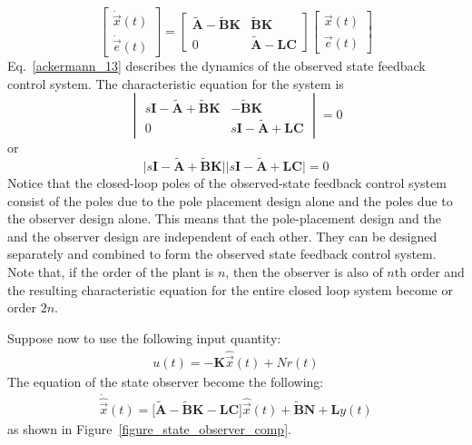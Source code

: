 \documentclass[12pt,a4paper,oneside]{book}
\begin{document}
\begin{onehalfspace}
\begin{equation} \label{ackermann_13}
	\begin{bmatrix} 
		\dot{\vec x}(t) \\[6pt]
		\dot{\vec e}(t) 
	\end{bmatrix} =
	\begin{bmatrix}
		\tilde{\mathbf{A}}-\tilde{\mathbf{B}}\mathbf{K} & 
		\tilde{\mathbf{B}}\mathbf{K} \\[6pt]
		0 & \tilde{\mathbf{A}}-\mathbf{LC} 
	\end{bmatrix}
	\begin{bmatrix} 
		\vec x(t) \\[6pt]
		\vec e(t)
	\end{bmatrix}
\end{equation}
Eq.~\eqref{ackermann_13} describes the dynamics of the observed state feedback 
control system.
The characteristic equation for the system is
\begin{equation} 
	\begin{vmatrix}
		s\mathbf{I} -\tilde{\mathbf{A}}+\tilde{\mathbf{B}}\mathbf{K} & 
		-\tilde{\mathbf{B}}\mathbf{K} \\[6pt]
		0 & s\mathbf{I} - \tilde{\mathbf{A}}+\mathbf{LC} 
	\end{vmatrix} = 0
\end{equation}
or 
\begin{equation} 
	\Big|s\mathbf{I} -\tilde{\mathbf{A}}+\tilde{\mathbf{B}}\mathbf{K}\Big|\Big| 
	s\mathbf{I} - \tilde{\mathbf{A}}+\mathbf{LC}\Big| = 0
\end{equation}
Notice that the closed-loop poles of the observed-state feedback control system consist of the poles due to the pole placement design alone and the poles due to the observer design alone. This means that the pole-placement design and the and the observer design are independent of each other.
They can be designed separately and combined to form the observed state 
feedback control system. Note that, if the order of the plant is $n$, then the 
observer is also of $n$th order and the resulting characteristic equation for 
the entire closed loop system become or order $2n$.

Suppose now to use the following input quantity:
\begin{equation}
	\begin{split}
		u(t)=-\mathbf{K}\hat{\vec x}(t) + Nr(t)
	\end{split}
\end{equation} 
The equation of the state observer become the following:
\begin{equation}
	\begin{split}
		\dot{\hat{\vec x}}(t) = 
		\Big[\tilde{\mathbf{A}}-\tilde{\mathbf{B}}\mathbf{K}-\mathbf{LC}\Big] 
		\hat{\vec{x}}(t)+\tilde{\mathbf{B}}\mathbf{N}+\mathbf{L}y(t)
	\end{split}
\end{equation} 
as shown in Figure~\ref{figure_state_observer_comp}.


\end{onehalfspace}
\end{document}
